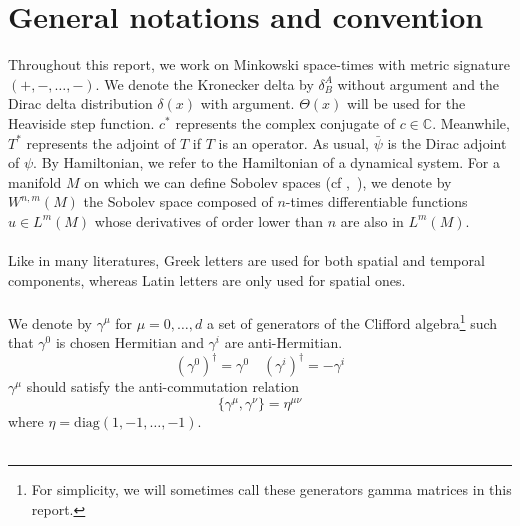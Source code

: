 \section*{General notations and convention}
Throughout this report, we work on Minkowski space-times with metric signature $(+, -,\ldots, -)$.
We denote the Kronecker delta by $\delta^A_B$ without argument and the Dirac delta distribution $\delta(x)$ with argument.
$\Theta(x)$ will be used for the Heaviside step function.
$c^*$ represents the complex conjugate of $c\in\mathbb{C}$. 
Meanwhile, $T^*$ represents the adjoint of $T$ if $T$ is an operator.
As usual, $\bar{\psi}$ is the Dirac adjoint of $\psi$.
By Hamiltonian, we refer to the Hamiltonian of a dynamical system.
For a manifold $M$ on which we can define Sobolev spaces (cf \eg\cite{Hebey1996},~\cite{Eichhorn1996}), 
we denote by $W^{n,m}(M)$ the Sobolev space composed of $n$-times differentiable functions $u\in L^m(M)$ whose derivatives of order lower than $n$ are also in $L^m(M)$.
\\\\
Like in many literatures, Greek letters are used for both spatial and temporal components, whereas Latin letters are only used for spatial ones. \\\\
We denote by $\gamma^\mu$ for $\mu = 0, \ldots, d$ a set of generators of the Clifford algebra\footnote{
For simplicity, we will sometimes call these generators gamma matrices in this report.
}
such that $\gamma^0$ is chosen Hermitian and $\gamma^i$ are anti-Hermitian.
\ie
\begin{equation*}
(\gamma^0)^\dagger = \gamma^0 \quad
(\gamma^i)^\dagger = -\gamma^i
\end{equation*}
$\gamma^\mu$ should satisfy the anti-commutation relation
\begin{equation*}
\{ \gamma^\mu, \gamma^\nu \} = \eta^{\mu\nu}
\end{equation*} 
where $\eta = \mathrm{diag}(1, -1 ,\ldots, -1)$. \\\\
